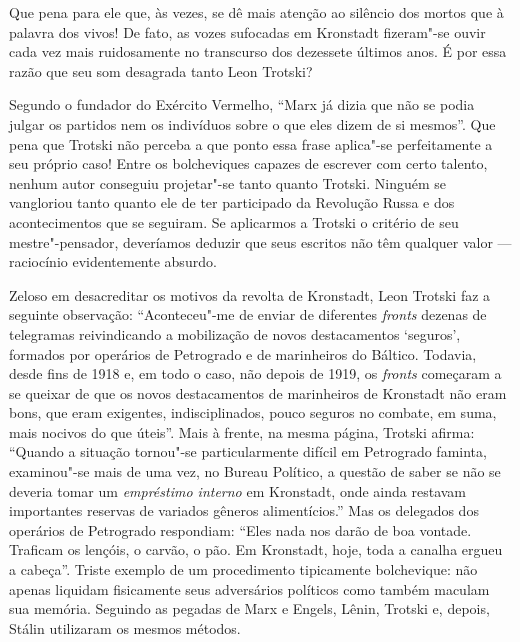 Que pena para ele que, às vezes, se dê mais atenção ao silêncio dos mortos
que à palavra dos vivos! De fato, as vozes sufocadas em Kronstadt
fizeram"-se ouvir cada vez mais ruidosamente no transcurso dos
dezessete últimos anos. É por essa razão que seu som desagrada tanto
Leon Trotski?

Segundo o fundador do Exército Vermelho, “Marx já dizia que não se podia
julgar os partidos nem os indivíduos sobre o que eles dizem de si
mesmos”. Que pena que Trotski não perceba a que ponto essa frase
aplica"-se perfeitamente a seu próprio caso! Entre os bolcheviques
capazes de escrever com certo talento, nenhum autor conseguiu
projetar"-se tanto quanto Trotski. Ninguém se vangloriou tanto quanto
ele de ter participado da Revolução Russa e dos acontecimentos que se
seguiram. Se aplicarmos a Trotski o critério de seu mestre"-pensador,
deveríamos deduzir que seus escritos não têm qualquer valor ---
raciocínio evidentemente absurdo.

Zeloso em desacreditar os motivos da revolta de Kronstadt, Leon Trotski
faz a seguinte observação: “Aconteceu"-me de enviar de diferentes
\textit{fronts} dezenas de telegramas reivindicando a mobilização de novos
destacamentos ‘seguros’, formados por operários de Petrogrado e de
marinheiros do Báltico. Todavia, desde fins de 1918 e, em todo o caso,
não depois de 1919, os \textit{fronts} começaram a se queixar de que os novos
destacamentos de marinheiros de Kronstadt não eram bons, que eram
exigentes, indisciplinados, pouco seguros no combate, em suma, mais
nocivos do que úteis”. Mais à frente, na mesma página, Trotski afirma:
``Quando a situação tornou"-se particularmente difícil em Petrogrado
faminta, examinou"-se mais de uma vez, no Bureau Político, a questão
de saber se não se deveria tomar um \textit{empréstimo interno} em
Kronstadt, onde ainda restavam importantes reservas de variados gêneros
alimentícios.'' Mas os delegados dos operários de Petrogrado respondiam:
“Eles nada nos darão de boa vontade. Traficam os lençóis, o carvão, o
pão. Em Kronstadt, hoje, toda a canalha ergueu a cabeça”. Triste
exemplo de um procedimento tipicamente bolchevique: não apenas liquidam
fisicamente seus adversários políticos como também maculam sua memória.
Seguindo as pegadas de Marx e Engels, Lênin, Trotski e, depois, Stálin
utilizaram os mesmos métodos.

